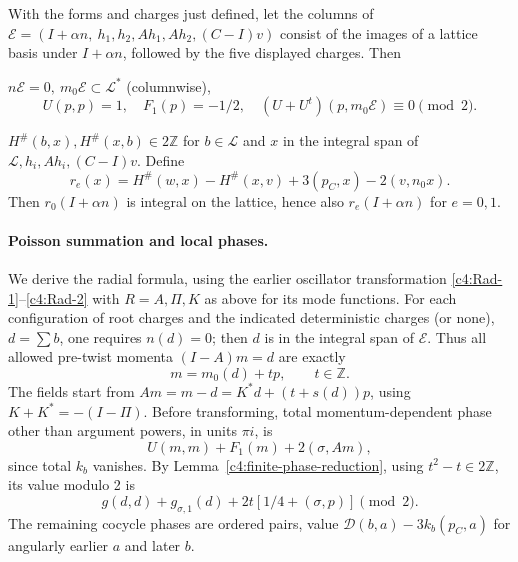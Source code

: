 \begin{lemma}\label{c4:finite-phase-reduction}
With the forms and charges just defined, let the columns of
\(\mathscr E=(I+\alpha n,\ h_1,h_2,Ah_1,Ah_2,(C-I)v)\)
consist of the images of a lattice basis under \(I+\alpha n\), followed
by the five displayed charges. Then
\par\noindent\textbullet\quad \(n\mathscr E=0,\ m_0\mathscr E\subset\mathcal L^*\) (columnwise),
\[
 U(p,p)=1,\quad F_1(p)=-1/2,\quad
              (U+U^t)(p,m_0\mathscr E)\equiv0\pmod{2}.
\]
\par\noindent\textbullet\quad \(H^\#(b,x),H^\#(x,b)\in2\mathbb Z\) for \(b\in\mathcal L\) and \(x\) in the integral span of \(\mathcal L,h_i,Ah_i,(C-I)v\). Define
\[
 r_e(x)=H^\#(w,x)-H^\#(x,v)+3(p_C,x)-2(v,n_0 x).
\]
Then \(r_0(I+\alpha n)\) is integral on the lattice, hence also \(r_e(I+\alpha n)\) for \(e=0,1\).
\end{lemma}

\paragraph{Poisson summation and local phases.} We derive the radial formula, using the earlier oscillator transformation \eqref{c4:Rad-1}--\eqref{c4:Rad-2} with \(R=A,\Pi,K\) as above for its mode functions. For each configuration of root charges and the indicated deterministic charges (or none), \(d=\sum b\), one requires \(n(d)=0\); then \(d\) is in the integral span of \(\mathscr E\). Thus all allowed pre-twist momenta \((I-A)m=d\) are exactly
\[
                          m=m_0(d)+t p,\qquad t\in\mathbb Z.
\]
The fields start from \(A m=m-d=K^*d+(t+s(d))p\), using \(K+K^*=-(I-\Pi)\). Before transforming, total momentum-dependent phase other than argument powers, in units \(\pi i\), is
\[
             U(m,m)+F_1(m)+2(\sigma,A m),
\]
since total \(k_b\) vanishes. By Lemma~\ref{c4:finite-phase-reduction},
using \(t^2-t\in2\mathbb Z\), its value modulo 2 is
\[
       g(d,d)+g_{\sigma,1}(d)+2t[1/4+(\sigma,p)] \pmod 2.
\]
The remaining cocycle phases are ordered pairs, value \(\mathcal D(b,a)-3 k_b(p_C,a)\) for angularly earlier \(a\) and later \(b\).

